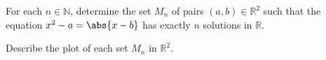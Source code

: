 For each $n \in \mathbb{N}$,
determine the set $M_n$ of pairs $(a, b) \in \mathbb{R}^{2}$
such that the equation $x^2 - a = \abs{x - b}$ has exactly $n$ solutions in $\mathbb{R}$.

Describe the plot of each set $M_n$ in $\mathbb{R}^{2}$.
